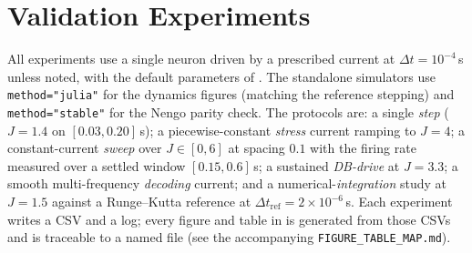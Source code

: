 \documentclass[journal]{IEEEtran}
\newcommand{\code}[1]{\texttt{#1}}
\begin{document}
\section{Validation Experiments}\label{sec:experiments}
All experiments use a single neuron driven by a prescribed current at
$\Delta t=10^{-4}\,$s unless noted, with the default parameters of
. The standalone simulators use \code{method="julia"} for the
dynamics figures (matching the reference stepping) and \code{method="stable"}
for the Nengo parity check. The protocols are: a single \emph{step}
($J=1.4$ on $[0.03,0.20]\,$s); a piecewise-constant \emph{stress} current
ramping to $J=4$; a constant-current \emph{sweep} over $J\in[0,6]$ at spacing
$0.1$ with the firing rate measured over a settled window $[0.15,0.6]\,$s; a
sustained \emph{DB-drive} at $J=3.3$; a smooth multi-frequency
\emph{decoding} current; and a numerical-\emph{integration} study at
$J=1.5$ against a Runge--Kutta reference at $\Delta t_{\mathrm{ref}}=2\times
10^{-6}\,$s. Each experiment writes a CSV and a log; every figure and table in
 is generated from those CSVs and is traceable to a named
file (see the accompanying \code{FIGURE\_TABLE\_MAP.md}).
\end{document}
